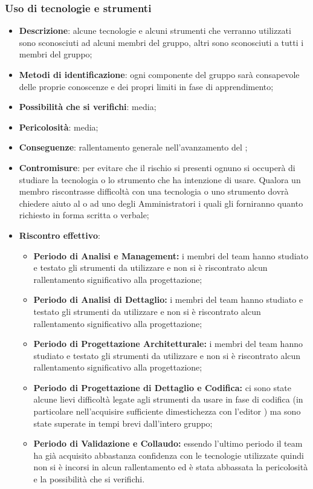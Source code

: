 		\subsubsection{Uso di tecnologie e strumenti}
			\begin{itemize}
				\item \textbf{Descrizione}: alcune tecnologie e alcuni strumenti che verranno utilizzati sono sconosciuti ad alcuni membri del gruppo, altri sono sconosciuti a tutti i membri del gruppo;
				\item \textbf{Metodi di identificazione}: ogni componente del gruppo sarà consapevole delle proprie conoscenze e dei propri limiti in fase di apprendimento;
				\item \textbf{Possibilità che si verifichi}: media;
				\item \textbf{Pericolosità}: media;
				\item \textbf{Conseguenze}: rallentamento generale nell'avanzamento del ;
				\item \textbf{Contromisure}:  per evitare che il rischio si presenti ognuno si occuperà di studiare la tecnologia o lo strumento che ha intenzione di usare. Qualora un membro riscontrasse difficoltà con una tecnologia o uno strumento dovrà chiedere aiuto al \RES{} o ad uno degli Amministratori i quali gli forniranno quanto richiesto in forma scritta o verbale;
				\item \textbf{Riscontro effettivo}:
				\begin{itemize}
					\item \textbf{Periodo di Analisi e Management:} i membri del team hanno studiato e testato gli strumenti da utilizzare e non si è riscontrato alcun rallentamento significativo alla progettazione;
					\item \textbf{Periodo di Analisi di Dettaglio:} i membri del team hanno studiato e testato gli strumenti da utilizzare e non si è riscontrato alcun rallentamento significativo alla progettazione;
					\item \textbf{Periodo di Progettazione Architetturale:} i membri del team hanno studiato e testato gli strumenti da utilizzare e non si è riscontrato alcun rallentamento significativo alla progettazione;
               \item \textbf{Periodo di Progettazione di Dettaglio e Codifica:} ci sono state alcune lievi difficoltà legate agli strumenti da usare in fase di codifica (in particolare nell'acquisire sufficiente dimestichezza con l'editor ) ma sono state superate in tempi brevi dall'intero gruppo;
               \item \textbf{Periodo di Validazione e Collaudo:} essendo l'ultimo periodo il team ha già acquisito abbastanza confidenza con le tecnologie utilizzate quindi non si è incorsi in alcun rallentamento ed è stata abbassata la pericolosità e la possibilità che si verifichi.
				\end{itemize}
			\end{itemize}

